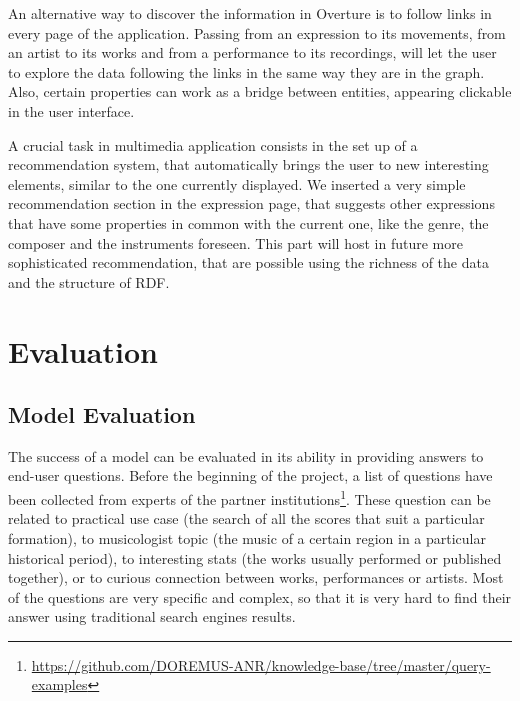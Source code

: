 \documentclass{article}
\begin{document}
An alternative way to discover the information in Overture is to follow links in every page of the application. Passing from an expression to its movements, from an artist to its works and from a performance to its recordings, will let the user to explore the data following the links in the same way they are in the graph. Also, certain properties can work as a bridge between entities, appearing clickable in the user interface.

A crucial task in multimedia application consists in the set up of a recommendation system, that automatically brings the user to new interesting elements, similar to the one currently displayed. We inserted a very simple recommendation section in the expression page, that suggests other expressions that have some properties in common with the current one, like the genre, the composer and the instruments foreseen. This part will host in future more sophisticated recommendation, that are possible using the richness of the data and the structure of RDF. 


\section{Evaluation}
\subsection{Model Evaluation}
The success of a model can be evaluated in its ability in providing answers to end-user questions. Before the beginning of the project, a list of questions have been collected from experts of the partner institutions\footnote{\url{https://github.com/DOREMUS-ANR/knowledge-base/tree/master/query-examples}}. These question can be related to practical use case (the search of all the scores that suit a particular formation), to musicologist topic (the music of a certain region in a particular historical period), to interesting stats (the works usually performed or published together), or to curious connection between works, performances or artists. Most of the questions are very specific and complex, so that it is very hard to find their answer using traditional search engines results.
\end{document}

